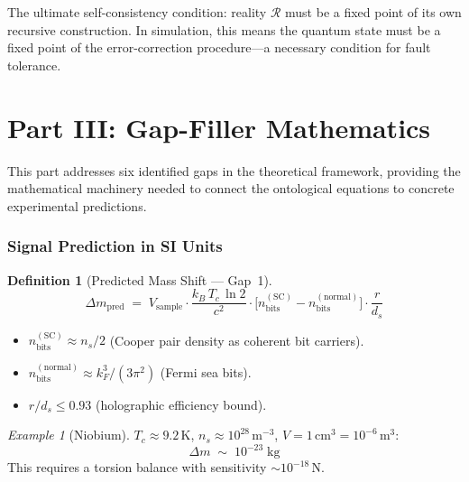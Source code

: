 \documentclass[11pt,a4paper]{article}
\newtheorem{definition}{Definition}[section]
\theoremstyle{remark}
\newtheorem{example}{Example}[section]
\newcommand{\CalR}{\mathcal{R}}
\begin{document}
The ultimate self-consistency condition: reality $\CalR$ must be a fixed point of its own recursive construction.  In simulation, this means the quantum state must be a fixed point of the error-correction procedure---a necessary condition for fault tolerance.

\part{Part III: Gap-Filler Mathematics}
\label{part:gapfiller}

This part addresses six identified gaps in the theoretical framework, providing the mathematical machinery needed to connect the ontological equations to concrete experimental predictions.

\section{Signal Prediction in SI Units}
\label{sec:signal}

\begin{definition}[Predicted Mass Shift --- Gap~1]
\begin{equation}\label{eq:dmpred}
    \Delta m_{\text{pred}} \;=\; V_{\text{sample}} \cdot
        \frac{k_B\, T_c\,\ln 2}{c^2} \cdot
        \bigl[n_{\text{bits}}^{(\text{SC})} - n_{\text{bits}}^{(\text{normal})}\bigr]
        \cdot \frac{r}{d_s}
\end{equation}
\end{definition}

\begin{itemize}[nosep]
    \item $n_{\text{bits}}^{(\text{SC})} \approx n_s / 2$ (Cooper pair density as coherent bit carriers).
    \item $n_{\text{bits}}^{(\text{normal})} \approx k_F^3 / (3\pi^2)$ (Fermi sea bits).
    \item $r/d_s \leq 0.93$ (holographic efficiency bound).
\end{itemize}

\begin{example}[Niobium]
$T_c \approx 9.2$\,K, $n_s \approx 10^{28}$\,m$^{-3}$, $V = 1$\,cm$^3 = 10^{-6}$\,m$^3$:
\[
    \Delta m \;\sim\; 10^{-23}\;\text{kg}
\]
This requires a torsion balance with sensitivity $\sim 10^{-18}$\,N.
\end{example}
\end{document}
